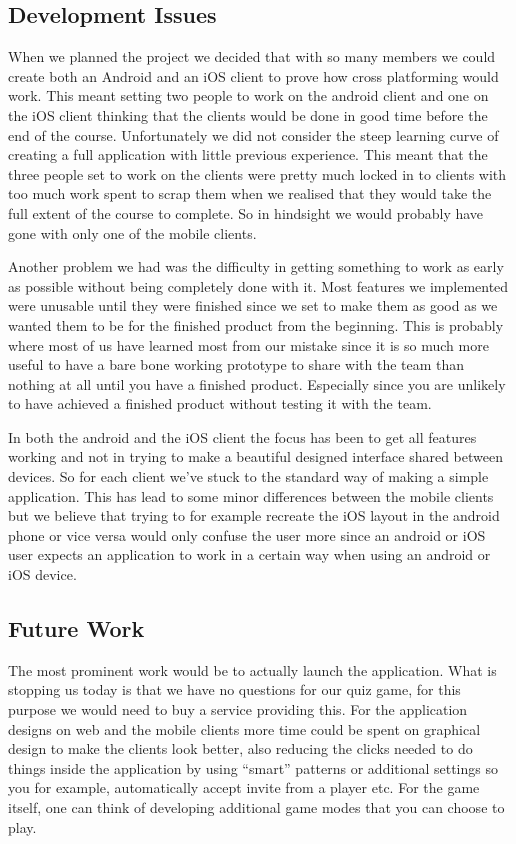 \subsection{Development Issues}
When we planned the project we decided that with so many members we could create both an Android and an iOS client to prove how cross platforming would work. This meant setting two people to work on the android client and one on the iOS client thinking that the clients would be done in good time before the end of the course. Unfortunately we did not consider the steep learning curve of creating a full application with little previous experience. This meant that the three people set to work on the clients were pretty much locked in to clients with too much work spent to scrap them when we realised that they would take the full extent of the course to complete. So in hindsight we would probably have gone with only one of the mobile clients. 

Another problem we had was the difficulty in getting something to work as early as possible without being completely done with it. Most features we implemented were unusable until they were finished since we set to make them as good as we wanted them to be for the finished product from the beginning. This is probably where most of us have learned most from our mistake since it is so much more useful to have a bare bone working prototype to share with the team than nothing at all until you have a finished product. Especially since you are unlikely to have achieved a finished product without testing it with the team. 

In both the android and the iOS client the focus has been to get all features working and not in trying to make a beautiful designed interface shared between devices. So for each client we've stuck to the standard way of making a simple application. This has lead to some minor differences between the mobile clients but we believe that trying to for example recreate the iOS layout in the android phone or vice versa would only confuse the user more since an android or iOS user expects an application to work in a certain way when using an android or iOS device. 
\subsection{Future Work}
The most prominent work would be to actually launch the application. What is stopping us today is that we have no questions for our quiz game, for this purpose we would need to buy a service providing this.
For the application designs on web and the mobile clients more time could be spent on graphical design to make the clients look better, also reducing the clicks needed to do things inside the application by using  ``smart'' patterns or additional settings so you for example, automatically accept invite from a player etc.
For the game itself, one can think of developing additional game modes that you can choose to play.
